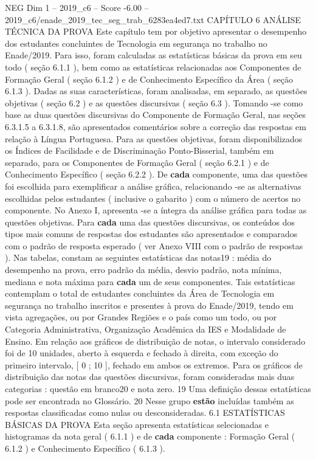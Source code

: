 \begin{textsample}{NEG Dim 1 – 2019\_c6 – Score -6.00 – 2019\_c6/enade\_2019\_tec\_seg\_trab\_6283ea4ed7.txt}  \label{ex:f1_neg_092}
CAPÍTULO 6 ANÁLISE TÉCNICA DA PROVA Este capítulo tem por objetivo apresentar o desempenho dos estudantes concluintes de Tecnologia em segurança no trabalho no Enade/2019.
Para isso, foram calculadas as estatísticas básicas da prova em seu todo ( seção 6.1.1 ), bem como as estatísticas relacionadas aos Componentes de Formação Geral ( seção 6.1.2 ) e de Conhecimento Específico da Área ( seção 6.1.3 ).
Dadas as suas características, foram analisadas, em separado, as questões objetivas ( seção 6.2 ) e as questões discursivas ( seção 6.3 ).
Tomando -se como base as duas questões discursivas do Componente de Formação Geral, nas seções 6.3.1.5 a 6.3.1.8, são apresentados comentários sobre a correção das respostas em relação à Língua Portuguesa.
Para as questões objetivas, foram disponibilizados os Índices de Facilidade e de Discriminação Ponto-Bisserial, também em separado, para os Componentes de Formação Geral ( seção 6.2.1 ) e de Conhecimento Específico ( seção 6.2.2 ).
De \textbf{cada} componente, uma das questões foi escolhida para exemplificar a análise gráfica, relacionando -se as alternativas escolhidas pelos estudantes ( inclusive o gabarito ) com o número de acertos no componente.
No Anexo I, apresenta -se a íntegra da análise gráfica para todas as questões objetivas.
Para \textbf{cada} uma das questões discursivas, os conteúdos dos tipos mais comuns de respostas dos estudantes são apresentados e comparados com o padrão de resposta esperado ( ver Anexo VIII com o padrão de respostas ).
Nas tabelas, constam as seguintes estatísticas das notas19 : média do desempenho na prova, erro padrão da média, desvio padrão, nota mínima, mediana e nota máxima para \textbf{cada} um de seus componentes.
Tais estatísticas contemplam o total de estudantes concluintes da Área de Tecnologia em segurança no trabalho inscritos e presentes à prova do Enade/2019, tendo em vista agregações, ou por Grandes Regiões e o país como um todo, ou por Categoria Administrativa, Organização Acadêmica da IES e Modalidade de Ensino.
Em relação aos gráficos de distribuição de notas, o intervalo considerado foi de 10 unidades, aberto à esquerda e fechado à direita, com exceção do primeiro intervalo, [ 0 ; 10 ], fechado em ambos os extremos.
Para os gráficos de distribuição das notas das questões discursivas, foram consideradas mais duas categorias : questão em branco20 e nota zero. 19 Uma definição dessas estatísticas pode ser encontrada no Glossário. 20 Nesse grupo \textbf{estão} incluídas também as respostas classificadas como nulas ou desconsideradas. 6.1 ESTATÍSTICAS BÁSICAS DA PROVA Esta seção apresenta estatísticas selecionadas e histogramas da nota geral ( 6.1.1 ) e de \textbf{cada} componente : Formação Geral ( 6.1.2 ) e Conhecimento Específico ( 6.1.3 ).

\end{textsample}
